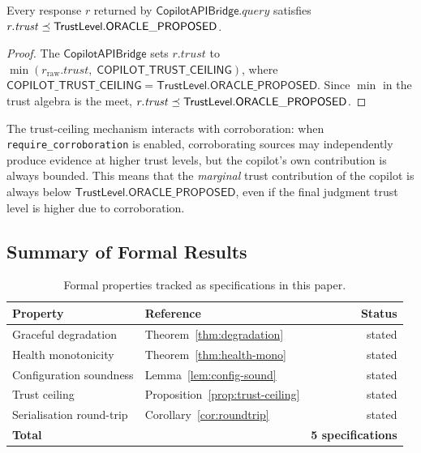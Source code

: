 \documentclass[11pt]{article}
\newcommand{\CAB}{\mathsf{CopilotAPIBridge}}
\newcommand{\TL}{\mathsf{TrustLevel}}
\begin{document}
\begin{proposition}\label{prop:trust-ceiling}
Every response $r$ returned by $\CAB.\mathit{query}$
satisfies
$r.\mathit{trust} \tleq \TL.\mathsf{ORACLE\_PROPOSED}$.
\end{proposition}

\begin{proof}
The $\CAB$ sets $r.\mathit{trust}$ to
$\min(r_{\mathrm{raw}}.\mathit{trust},\;
\mathsf{COPILOT\_TRUST\_CEILING})$, where
$\mathsf{COPILOT\_TRUST\_CEILING} =
\TL.\mathsf{ORACLE\_PROPOSED}$.  Since $\min$ in the
trust algebra is the meet, $r.\mathit{trust} \tleq
\TL.\mathsf{ORACLE\_PROPOSED}$.
\end{proof}

The trust-ceiling mechanism interacts with corroboration:
when \texttt{require\_corroboration} is enabled, corroborating
sources may independently produce evidence at higher trust levels,
but the copilot's own contribution is always bounded.  This means
that the \emph{marginal} trust contribution of the copilot is
always below $\TL.\mathsf{ORACLE\_PROPOSED}$, even if
the final judgment trust level is higher due to corroboration.

\subsection{Summary of Formal Results}

\begin{table}[t]
\centering
\caption{Formal properties tracked as specifications in this paper.}
\label{tab:formal}
\begin{tabular}{@{}llr@{}}
\toprule
Property & Reference & Status \\
\midrule
Graceful degradation       & Theorem~\ref{thm:degradation}  & stated \\
Health monotonicity        & Theorem~\ref{thm:health-mono}  & stated \\
Configuration soundness    & Lemma~\ref{lem:config-sound}   & stated \\
Trust ceiling              & Proposition~\ref{prop:trust-ceiling} & stated \\
Serialisation round-trip   & Corollary~\ref{cor:roundtrip}  & stated \\
\midrule
\textbf{Total} & & \textbf{5 specifications} \\
\bottomrule
\end{tabular}
\end{table}
\end{document}
